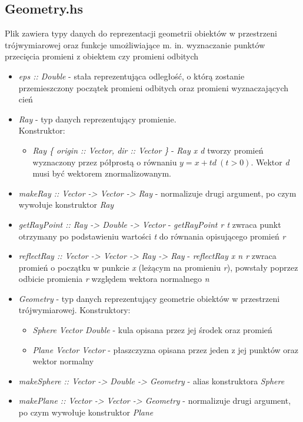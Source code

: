 \documentclass[11pt,a4paper]{article}
\begin{document}
\subsection{Geometry.hs}
Plik zawiera typy danych do reprezentacji geometrii obiektów w przestrzeni trójwymiarowej oraz funkcje umożliwiające m. in. wyznaczanie punktów przecięcia promieni z obiektem czy promieni odbitych
\begin{itemize}
\item\textit{eps :: Double} - stała reprezentująca odległość, o którą zostanie przemieszczony początek promieni odbitych oraz promieni wyznaczających cień
\item\textit{Ray} - typ danych reprezentujący promienie.\\Konstruktor:
\begin{itemize}
\item\textit{Ray \{ origin :: Vector, dir :: Vector \}} - \textit{Ray x d} tworzy promień wyznaczony przez półprostą o równaniu $y = x + td\ (t > 0)$. Wektor \textit{d} musi być wektorem znormalizowanym.
\end{itemize}
\item\textit{makeRay :: Vector -> Vector -> Ray} - normalizuje drugi argument, po czym wywołuje konstruktor \textit{Ray}
\item\textit{getRayPoint :: Ray -> Double -> Vector} - \textit{getRayPoint r t} zwraca punkt otrzymany po podstawieniu wartości \textit{t} do równania opisującego promień \textit{r}
\item\textit{reflectRay :: Vector -> Vector -> Ray -> Ray} - \textit{reflectRay x n r} zwraca promień o początku w punkcie \textit{x} (leżącym na promieniu \textit{r}), powstały poprzez odbicie promienia \textit{r} względem wektora normalnego \textit{n}
\item\textit{Geometry} - typ danych reprezentujący geometrie obiektów w przestrzeni trójwymiarowej. Konstruktory:
\begin{itemize}
\item\textit{Sphere Vector Double} - kula opisana przez jej środek oraz promień
\item\textit{Plane Vector Vector} - płaszczyzna opisana przez jeden z jej punktów oraz wektor normalny
\end{itemize}
\item\textit{makeSphere :: Vector -> Double -> Geometry} - alias konstruktora \textit{Sphere}
\item\textit{makePlane :: Vector -> Vector -> Geometry} - normalizuje drugi argument, po czym wywołuje konstruktor \textit{Plane}

\end{itemize}
\end{document}
